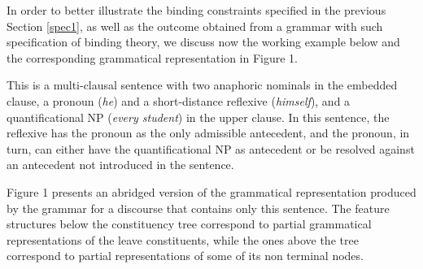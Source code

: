 \documentclass[output=paper
,modfonts
,nonflat]{langsci/langscibook}
\begin{document}
In order to better illustrate the binding constraints specified in the previous Section \ref{spec1}, 
as well as the outcome obtained from a grammar with such specification
of binding theory,
we discuss now the working example below and the corresponding grammatical
representation in Figure 1. %
%



\begin{exe}
\end{exe}

This is a
multi-clausal sentence with two anaphoric nominals in the embedded
clause, a pronoun (\emph{he}) and a short-distance reflexive (\emph{himself}), and a quantificational
NP (\emph{every student}) in the upper clause. In this sentence,
the reflexive has the pronoun as the only admissible antecedent,
and the pronoun, in turn, can either have the quantificational
NP as antecedent or be resolved against an antecedent not 
introduced in the sentence.

Figure 1 presents an abridged version of the grammatical 
representation produced by the grammar for a discourse
that contains only this sentence.
The feature structures below the constituency tree correspond to partial grammatical 
representations of the leave constituents, while the ones above the 
tree correspond to partial representations of some of its non terminal nodes.
\end{document}
